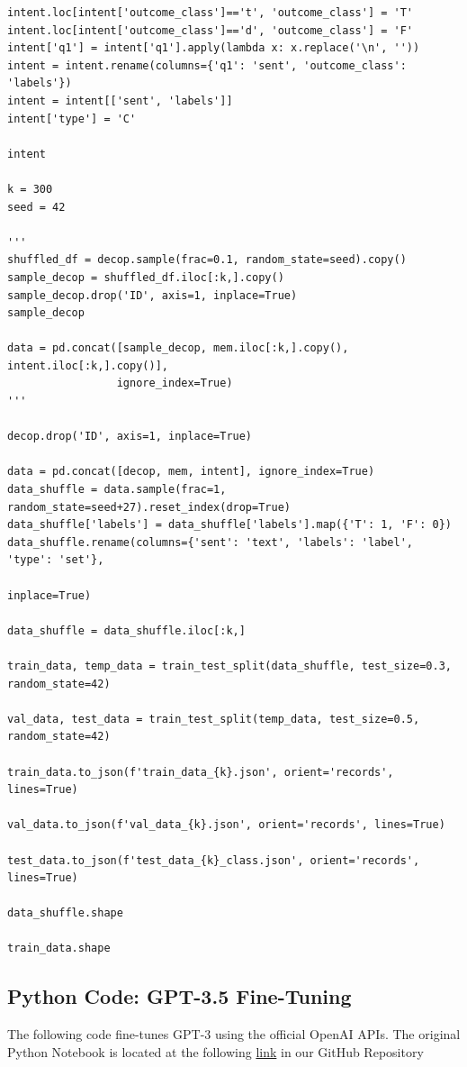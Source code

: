 \documentclass[10pt,twocolumn,letterpaper]{article}
\begin{document}
\begin{verbatim}
intent.loc[intent['outcome_class']=='t', 'outcome_class'] = 'T'
intent.loc[intent['outcome_class']=='d', 'outcome_class'] = 'F'
intent['q1'] = intent['q1'].apply(lambda x: x.replace('\n', ''))
intent = intent.rename(columns={'q1': 'sent', 'outcome_class': 'labels'})
intent = intent[['sent', 'labels']]
intent['type'] = 'C'

intent

k = 300
seed = 42

'''
shuffled_df = decop.sample(frac=0.1, random_state=seed).copy()
sample_decop = shuffled_df.iloc[:k,].copy()
sample_decop.drop('ID', axis=1, inplace=True)
sample_decop

data = pd.concat([sample_decop, mem.iloc[:k,].copy(), intent.iloc[:k,].copy()],
                 ignore_index=True)
'''

decop.drop('ID', axis=1, inplace=True)

data = pd.concat([decop, mem, intent], ignore_index=True)
data_shuffle = data.sample(frac=1, random_state=seed+27).reset_index(drop=True)
data_shuffle['labels'] = data_shuffle['labels'].map({'T': 1, 'F': 0})
data_shuffle.rename(columns={'sent': 'text', 'labels': 'label', 'type': 'set'}, 
                                                                        inplace=True)

data_shuffle = data_shuffle.iloc[:k,]

train_data, temp_data = train_test_split(data_shuffle, test_size=0.3, random_state=42)

val_data, test_data = train_test_split(temp_data, test_size=0.5, random_state=42)

train_data.to_json(f'train_data_{k}.json', orient='records', lines=True)

val_data.to_json(f'val_data_{k}.json', orient='records', lines=True)

test_data.to_json(f'test_data_{k}_class.json', orient='records', lines=True)

data_shuffle.shape

train_data.shape
\end{verbatim}

\subsection{Python Code: GPT-3.5 Fine-Tuning}

The following code fine-tunes GPT-3 using the official OpenAI APIs.
The original Python Notebook is located at the following \href{https://colab.research.google.com/github/TannerAGraves/GPT-LieDetection/blob/main/gpt3.5/API_scratch.ipynb}{link} in our GitHub Repository
\end{document}
